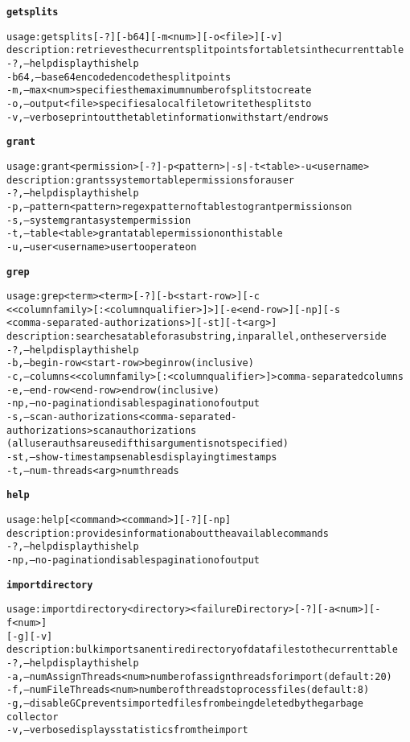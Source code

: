 \begin{alltt}
\textbf{getsplits}

    usage: getsplits [-?] [-b64] [-m <num>] [-o <file>] [-v]
    description: retrieves the current split points for tablets in the current table
      -?,--help  display this help
      -b64,--base64encoded	encode the split points
      -m,--max <num>  specifies the maximum number of splits to create
      -o,--output <file>  specifies a local file to write the splits to
      -v,--verbose	print out the tablet information with start/end rows

\textbf{grant}

    usage: grant <permission> [-?] -p <pattern> | -s | -t <table>  -u <username>
    description: grants system or table permissions for a user
      -?,--help  display this help
      -p,--pattern <pattern>  regex pattern of tables to grant permissions on
      -s,--system  grant a system permission
      -t,--table <table>  grant a table permission on this table
      -u,--user <username>	user to operate on

\textbf{grep}

    usage: grep <term>{ <term>} [-?] [-b <start-row>] [-c
    	      <{<columnfamily>[:<columnqualifier>]}>] [-e <end-row>] [-np] [-s
    	      <comma-separated-authorizations>] [-st] [-t <arg>]
    description: searches a table for a substring, in parallel, on the server side
      -?,--help  display this help
      -b,--begin-row <start-row>  begin row (inclusive)
      -c,--columns <{<columnfamily>[:<columnqualifier>]}>  comma-separated columns
      -e,--end-row <end-row>  end row (inclusive)
      -np,--no-pagination  disables pagination of output
      -s,--scan-authorizations <comma-separated-authorizations>  scan authorizations
    	      (all user auths are used if this argument is not specified)
      -st,--show-timestamps  enables displaying timestamps
      -t,--num-threads <arg>  num threads

\textbf{help}

    usage: help [ <command>{ <command>} ] [-?] [-np]
    description: provides information about the available commands
      -?,--help  display this help
      -np,--no-pagination  disables pagination of output

\textbf{importdirectory}

    usage: importdirectory <directory> <failureDirectory> [-?] [-a <num>] [-f <num>]
    	      [-g] [-v]
    description: bulk imports an entire directory of data files to the current table
      -?,--help  display this help
      -a,--numAssignThreads <num>  number of assign threads for import (default: 20)
      -f,--numFileThreads <num>  number of threads to process files (default: 8)
      -g,--disableGC  prevents imported files from being deleted by the garbage
    	      collector
      -v,--verbose	displays statistics from the import


\end{alltt}

